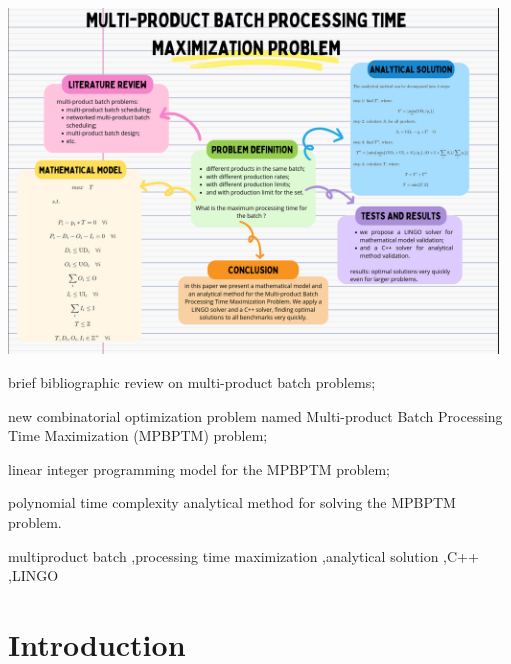 \documentclass[authoryear,preprint,12pt]{elsarticle}
\begin{document}
\begin{frontmatter}
\begin{graphicalabstract}
\includegraphics[width=13cm]{graphical.png}
\end{graphicalabstract}

\begin{highlights}
\item brief bibliographic review on multi-product batch problems;
\item new combinatorial optimization problem named Multi-product Batch Processing Time Maximization (MPBPTM) problem;
\item linear integer programming model for the MPBPTM problem;
\item polynomial time complexity analytical method for solving the MPBPTM problem.
\end{highlights}

\begin{keyword}
multiproduct batch \sep processing time maximization \sep analytical solution \sep C++ \sep LINGO



\end{keyword}

\end{frontmatter}


\section{Introduction}
\label{sec:intro}
\end{document}
